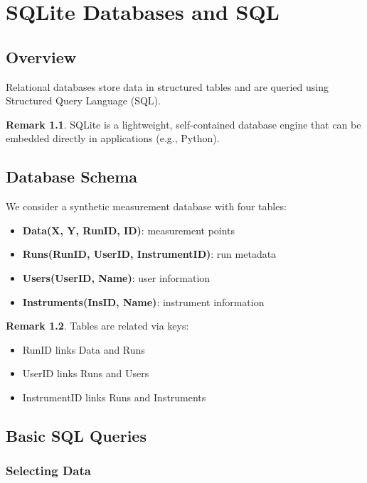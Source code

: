 \documentclass[12pt,oneside]{book}
\numberwithin{equation}{section}
\theoremstyle{definition}
\newtheorem{remark}{Remark}[section]
\theoremstyle{plain}
\theoremstyle{remark}
\begin{document}
\chapter{SQLite Databases and SQL}

\section{Overview}

Relational databases store data in structured tables and are queried using Structured Query Language (SQL).

\begin{remark}
SQLite is a lightweight, self-contained database engine that can be embedded directly in applications (e.g., Python).
\end{remark}

\section{Database Schema}

We consider a synthetic measurement database with four tables:

\begin{itemize}
    \item \textbf{Data(X, Y, RunID, ID)}: measurement points
    \item \textbf{Runs(RunID, UserID, InstrumentID)}: run metadata
    \item \textbf{Users(UserID, Name)}: user information
    \item \textbf{Instruments(InsID, Name)}: instrument information
\end{itemize}

\begin{remark}
Tables are related via keys:
\begin{itemize}
    \item RunID links Data and Runs
    \item UserID links Runs and Users
    \item InstrumentID links Runs and Instruments
\end{itemize}
\end{remark}

\section{Basic SQL Queries}

\subsection{Selecting Data}
\end{document}

